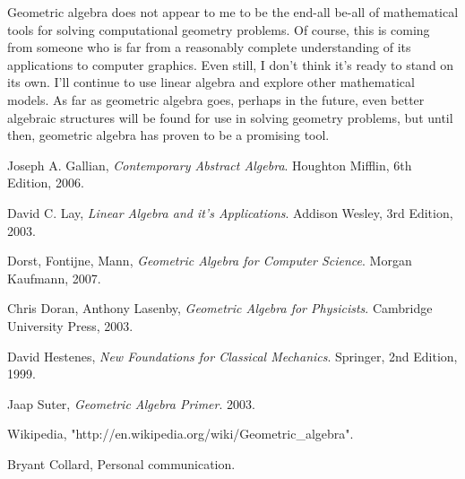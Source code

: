 \documentclass{article}
\begin{document}
Geometric algebra does not appear to me to be the end-all be-all of mathematical
tools for solving computational geometry problems.  Of course, this is coming from someone
who is far from a reasonably complete understanding of its applications to
computer graphics.  Even still, I don't think it's ready to stand on its own.
I'll continue to use linear algebra and explore other mathematical models.
As far as geometric algebra goes, perhaps in the future, even better algebraic
structures will be found for use in solving geometry problems, but until then, geometric
algebra has proven to be a promising tool.

\begin{thebibliography}{9}

	Joseph A. Gallian,
	\emph{Contemporary Abstract Algebra}.
	Houghton Mifflin,
	6th Edition,
	2006.

	David C. Lay,
	\emph{Linear Algebra and it's Applications}.
	Addison Wesley,
	3rd Edition,
	2003.

	Dorst, Fontijne, Mann,
	\emph{Geometric Algebra for Computer Science}.
	Morgan Kaufmann,
	2007.

	Chris Doran, Anthony Lasenby,
	\emph{Geometric Algebra for Physicists}.
	Cambridge University Press,
	2003.

	David Hestenes,
	\emph{New Foundations for Classical Mechanics}.
	Springer,
	2nd Edition,
	1999.

	Jaap Suter,
	\emph{Geometric Algebra Primer}.
	2003.

	Wikipedia, "http://en.wikipedia.org/wiki/Geometric\_algebra".

	Bryant Collard, Personal communication.

\end{thebibliography}
\end{document}
